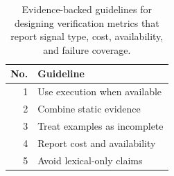 \begin{table}[!htbp]
\centering
\scriptsize
\begin{tabular}{rl}
\toprule
No. & Guideline \\
\midrule
1 & Use execution when available \\
2 & Combine static evidence \\
3 & Treat examples as incomplete \\
4 & Report cost and availability \\
5 & Avoid lexical-only claims \\
\bottomrule
\end{tabular}
\vspace{0.5em}
\caption{Evidence-backed guidelines for designing verification metrics that report signal type, cost, availability, and failure coverage.}
\label{tab:metric-guidelines}
\end{table}
